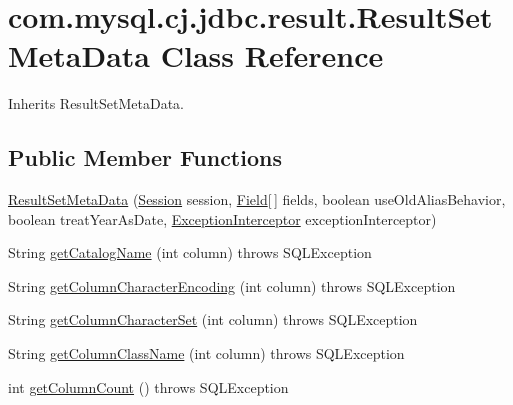 \hypertarget{classcom_1_1mysql_1_1cj_1_1jdbc_1_1result_1_1_result_set_meta_data}{}\section{com.\+mysql.\+cj.\+jdbc.\+result.\+Result\+Set\+Meta\+Data Class Reference}
\label{classcom_1_1mysql_1_1cj_1_1jdbc_1_1result_1_1_result_set_meta_data}


Inherits Result\+Set\+Meta\+Data.

\subsection*{Public Member Functions}
\begin{DoxyCompactItemize}
\item 
\mbox{\hyperlink{classcom_1_1mysql_1_1cj_1_1jdbc_1_1result_1_1_result_set_meta_data_af01bb104a1e170fc5592c8eac2951f74}{Result\+Set\+Meta\+Data}} (\mbox{\hyperlink{interfacecom_1_1mysql_1_1cj_1_1_session}{Session}} session, \mbox{\hyperlink{classcom_1_1mysql_1_1cj_1_1result_1_1_field}{Field}}\mbox{[}$\,$\mbox{]} fields, boolean use\+Old\+Alias\+Behavior, boolean treat\+Year\+As\+Date, \mbox{\hyperlink{interfacecom_1_1mysql_1_1cj_1_1exceptions_1_1_exception_interceptor}{Exception\+Interceptor}} exception\+Interceptor)
\item 
String \mbox{\hyperlink{classcom_1_1mysql_1_1cj_1_1jdbc_1_1result_1_1_result_set_meta_data_aca486707c1e8d95a79047ebf3f49b6ba}{get\+Catalog\+Name}} (int column)  throws S\+Q\+L\+Exception 
\item 
String \mbox{\hyperlink{classcom_1_1mysql_1_1cj_1_1jdbc_1_1result_1_1_result_set_meta_data_abfd035bc40f6045a5cf598f239f0c254}{get\+Column\+Character\+Encoding}} (int column)  throws S\+Q\+L\+Exception 
\item 
String \mbox{\hyperlink{classcom_1_1mysql_1_1cj_1_1jdbc_1_1result_1_1_result_set_meta_data_a35f38f97a73023c2496720366e165acb}{get\+Column\+Character\+Set}} (int column)  throws S\+Q\+L\+Exception 
\item 
String \mbox{\hyperlink{classcom_1_1mysql_1_1cj_1_1jdbc_1_1result_1_1_result_set_meta_data_a6aeea7ec7447ad647fbf8c94db5dbe76}{get\+Column\+Class\+Name}} (int column)  throws S\+Q\+L\+Exception 
\item 
int \mbox{\hyperlink{classcom_1_1mysql_1_1cj_1_1jdbc_1_1result_1_1_result_set_meta_data_ac932178b87c021541739d811a6b99fb1}{get\+Column\+Count}} ()  throws S\+Q\+L\+Exception 

\end{DoxyCompactItemize}

